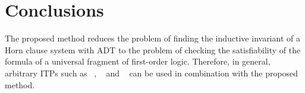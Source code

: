 \section{Conclusions}\label{sec:fmf/conclusion}
The proposed method reduces the problem of finding the inductive invariant of a Horn clause system with ADT to the problem of checking the satisfiability of the formula of a universal fragment of first-order logic.
Therefore, in general, arbitrary ITPs such as \vampire{}~\cite{kovacs2013first}, \eprover{}~\cite{10.5555/1218615.1218621} and \zipperposition{}~\cite{10.1007/978-3-319-66167-4_10} can be used in combination with the proposed method.
